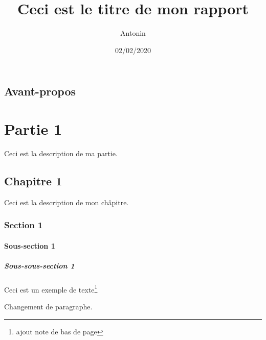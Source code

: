\documentclass[a4paper,french,11pt]{report}
\title{Ceci est le titre de mon rapport}
\author{Antonin}
\date{02/02/2020}
\begin{document}
\maketitle %

\tableofcontents %

\chapter*{Avant-propos}

\part{Partie 1}
Ceci est la description de ma partie.

\chapter{Chapitre 1}
Ceci est la description de mon châpitre.

\section{Section 1}
\subsection{Sous-section 1}
\subsubsection{Sous-sous-section 1}

Ceci est un exemple de texte\thanks{ajout note de bas de page}

Changement de paragraphe.

\printbibliography[heading=bibintoc,title={Bibliographie}]
\end{document}
